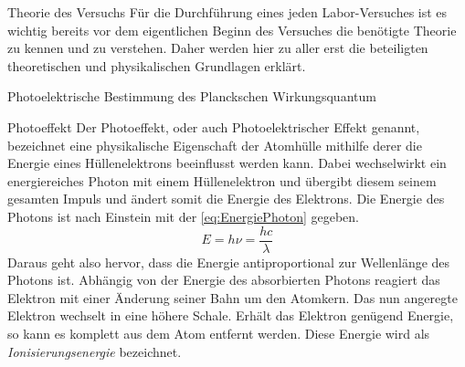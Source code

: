 \documentclass[pdftex, a4paper,11pt, twoside, ngerman]{report}
\begin{document}
  \begin{chapter}{Theorie des Versuchs}
    \label{chp:Theorie}
    Für die Durchführung eines jeden Labor-Versuches ist es wichtig bereits vor dem eigentlichen Beginn des Versuches die benötigte Theorie zu kennen und zu verstehen. Daher werden hier zu aller erst die beteiligten theoretischen und physikalischen Grundlagen erklärt.
    
    
    
    \begin{section}{Photoelektrische Bestimmung des Planckschen Wirkungsquantum}
      \label{chp:TheoriePhotoelektrischesWirkungsquantum}
      
      
      
      \begin{subsection}{Photoeffekt}
	\label{chp:TheoriePhotoelektrischesWirkungsquantumPhotoeffekt}
	Der Photoeffekt, oder auch Photoelektrischer Effekt genannt, bezeichnet eine physikalische Eigenschaft der Atomhülle mithilfe derer die Energie eines Hüllenelektrons beeinflusst werden kann. Dabei wechselwirkt ein energiereiches Photon mit einem Hüllenelektron und übergibt diesem seinem gesamten Impuls und ändert somit die Energie des Elektrons. Die Energie des Photons ist nach Einstein mit der \cref{eq:EnergiePhoton} gegeben.
	\begin{equation}
	  \label{eq:EnergiePhoton}
	  E=h\nu=\frac{hc}{\lambda}
	\end{equation}
	Daraus geht also hervor, dass die Energie antiproportional zur Wellenlänge des Photons ist. Abhängig von der Energie des absorbierten Photons reagiert das Elektron mit einer Änderung seiner Bahn um den Atomkern. Das nun angeregte Elektron wechselt in eine höhere Schale. Erhält das Elektron genügend Energie, so kann es komplett aus dem Atom entfernt werden. Diese Energie wird als \textit{Ionisierungsenergie} bezeichnet.
	

\end{subsection}
\end{section}
\end{chapter}
\end{document}
